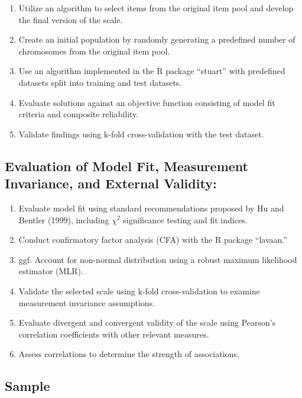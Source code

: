 \documentclass[
  12pt,
  a4paper,
  twoside]{article}
\providecommand{\tightlist}{%
  \setlength{\itemsep}{0pt}\setlength{\parskip}{0pt}}
\begin{document}
\begin{enumerate}
\def\labelenumi{\arabic{enumi}.}
\tightlist
\item
  Utilize an algorithm to select items from the original item pool and develop the final version of the scale.
\item
  Create an initial population by randomly generating a predefined number of chromosomes from the original item pool.
\item
  Use an algorithm implemented in the R package ``stuart'' with predefined datasets split into training and test datasets.
\item
  Evaluate solutions against an objective function consisting of model fit criteria and composite reliability.
\item
  Validate findings using k-fold cross-validation with the test dataset.
\end{enumerate}

\hypertarget{evaluation-of-model-fit-measurement-invariance-and-external-validity}{%
\subsection{Evaluation of Model Fit, Measurement Invariance, and External Validity:}\label{evaluation-of-model-fit-measurement-invariance-and-external-validity}}

\begin{enumerate}
\def\labelenumi{\arabic{enumi}.}
\tightlist
\item
  Evaluate model fit using standard recommendations proposed by Hu and Bentler (1999), including \(\chi^2\) significance testing and fit indices.
\item
  Conduct confirmatory factor analysis (CFA) with the R package ``lavaan.''
\item
  ggf. Account for non-normal distribution using a robust maximum likelihood estimator (MLR).
\item
  Validate the selected scale using k-fold cross-validation to examine measurement invariance assumptions.
\item
  Evaluate divergent and convergent validity of the scale using Pearson's correlation coefficients with other relevant measures.
\item
  Assess correlations to determine the strength of associations.
\end{enumerate}

\hypertarget{sample}{%
\subsection{Sample}\label{sample}}
\end{document}
